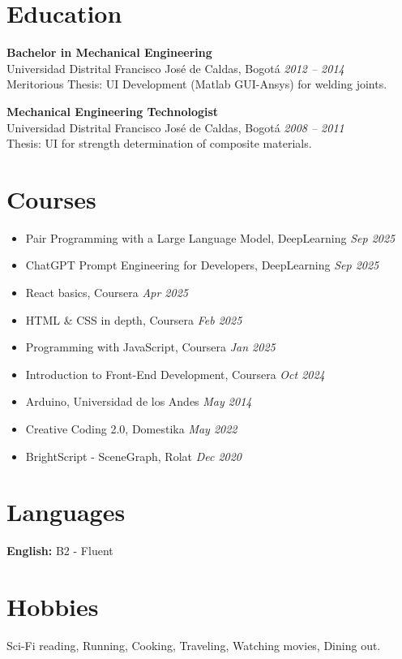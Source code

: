\documentclass[11pt,a4paper]{article}
\begin{document}
\section*{Education}
\textbf{Bachelor in Mechanical Engineering} \\
Universidad Distrital Francisco José de Caldas, Bogotá \hfill \textit{2012 -- 2014} \\
Meritorious Thesis: UI Development (Matlab GUI-Ansys) for welding joints.

\textbf{Mechanical Engineering Technologist} \\
Universidad Distrital Francisco José de Caldas, Bogotá \hfill \textit{2008 -- 2011} \\
Thesis: UI for strength determination of composite materials.

\section*{Courses}
\begin{itemize}[leftmargin=*]
    \item Pair Programming with a Large Language Model, DeepLearning \hfill \textit{Sep 2025}
    \item ChatGPT Prompt Engineering for Developers, DeepLearning \hfill \textit{Sep 2025}
    \item React basics, Coursera \hfill \textit{Apr 2025}
    \item HTML \& CSS in depth, Coursera \hfill \textit{Feb 2025}
    \item Programming with JavaScript, Coursera \hfill \textit{Jan 2025}
    \item Introduction to Front-End Development, Coursera \hfill \textit{Oct 2024}
    \item Arduino, Universidad de los Andes \hfill \textit{May 2014}
    \item Creative Coding 2.0, Domestika \hfill \textit{May 2022}
    \item BrightScript - SceneGraph, Rolat \hfill \textit{Dec 2020}
\end{itemize}

\section*{Languages}
\textbf{English:} B2 - Fluent

\section*{Hobbies}
Sci-Fi reading, Running, Cooking, Traveling, Watching movies, Dining out.
\end{document}
